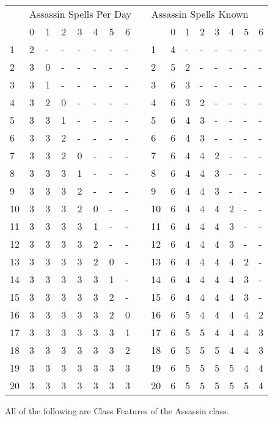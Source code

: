 \begin{floatingfigure}{3.9in}
\begin{small}
\noindent\begin{tabular}{lllllllllllllllll}
 & \multicolumn{7}{c}{Assassin Spells Per Day}  &   &\multicolumn{7}{c}{Assassin Spells Known}\\
  &0 &1 &2 &3 &4 &5 &6 &  &  &0 &1 &2 &3 &4 &5 &6\\
1 &2 &- &- &- &- &- &- &  &1 &4 &- &- &- &- &- &-\\
2 &3 &0 &- &- &- &- &- &  &2 &5 &2 &- &- &- &- &-\\
3 &3 &1 &- &- &- &- &- &  &3 &6 &3 &- &- &- &- &-\\
4 &3 &2 &0 &- &- &- &- &  &4 &6 &3 &2 &- &- &- &-\\
5 &3 &3 &1 &- &- &- &- &  &5 &6 &4 &3 &- &- &- &-\\
6 &3 &3 &2 &- &- &- &- &  &6 &6 &4 &3 &- &- &- &-\\
7 &3 &3 &2 &0 &- &- &- &  &7 &6 &4 &4 &2 &- &- &-\\
8 &3 &3 &3 &1 &- &- &- &  &8 &6 &4 &4 &3 &- &- &-\\
9 &3 &3 &3 &2 &- &- &- &  &9 &6 &4 &4 &3 &- &- &-\\
10 &3 &3 &3 &2 &0 &- &- &  &10 &6 &4 &4 &4 &2 &- &-\\
11 &3 &3 &3 &3 &1 &- &- &  &11 &6 &4 &4 &4 &3 &- &-\\
12 &3 &3 &3 &3 &2 &- &- &  &12 &6 &4 &4 &4 &3 &- &-\\
13 &3 &3 &3 &3 &2 &0 &- &  &13 &6 &4 &4 &4 &4 &2 &-\\
14 &3 &3 &3 &3 &3 &1 &- &  &14 &6 &4 &4 &4 &4 &3 &-\\
15 &3 &3 &3 &3 &3 &2 &- &  &15 &6 &4 &4 &4 &4 &3 &-\\
16 &3 &3 &3 &3 &3 &2 &0 &  &16 &6 &5 &4 &4 &4 &4 &2\\
17 &3 &3 &3 &3 &3 &3 &1 &  &17 &6 &5 &5 &4 &4 &4 &3\\
18 &3 &3 &3 &3 &3 &3 &2 &  &18 &6 &5 &5 &5 &4 &4 &3\\
19 &3 &3 &3 &3 &3 &3 &3 &  &19 &6 &5 &5 &5 &5 &4 &4\\
20 &3 &3 &3 &3 &3 &3 &3 &  &20 &6 &5 &5 &5 &5 &5 &4\\
\end{tabular}
\end{small}
\end{floatingfigure}

\smallskip\noindent All of the following are Class Features of the Assassin class.

